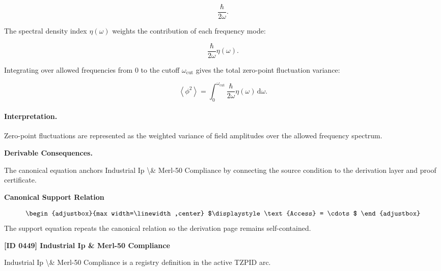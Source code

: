\begin{equation}
\frac{\hbar}{2\omega}.
\end{equation}

The spectral density index $\eta(\omega)$ weights the contribution of each frequency mode:

\begin{equation}
\frac{\hbar}{2\omega}\eta(\omega).
\end{equation}

Integrating over allowed frequencies from $0$ to the cutoff $\omega_{\mathrm{cut}}$ gives the total zero-point fluctuation variance:

\begin{equation}
\boxed{
\left\langle\phi^2\right\rangle
=
\int_{0}^{\omega_{\mathrm{cut}}}
\frac{\hbar}{2\omega}
\eta(\omega)
\,\mathrm{d}\omega .
}
\end{equation}

\paragraph{Interpretation.}
Zero-point fluctuations are represented as the weighted variance of field amplitudes over the allowed frequency spectrum.

\par\vspace{0.35em}
\noindent\textbf{Derivable Consequences.}\quad
\begingroup
\footnotesize
\raggedright
The canonical equation anchors Industrial Ip \textbackslash{}\& Merl-50 Compliance by connecting the source condition to the derivation layer and proof certificate.
\par\endgroup

\noindent\textbf{Canonical Support Relation}\par
\[
\begin{adjustbox}{max width=\linewidth,center}
$\displaystyle
\text{Access} = \cdots
$
\end{adjustbox}
\]
\noindent The support equation repeats the canonical relation so the derivation page remains self-contained.\par

\clearpage
\noindent\textbf{[ID 0449] Industrial Ip \& Merl-50 Compliance}\par
\vspace{0.35em}
\begingroup\small
{}
Industrial Ip \textbackslash{}\& Merl-50 Compliance is a registry definition in the active TZPID arc.

